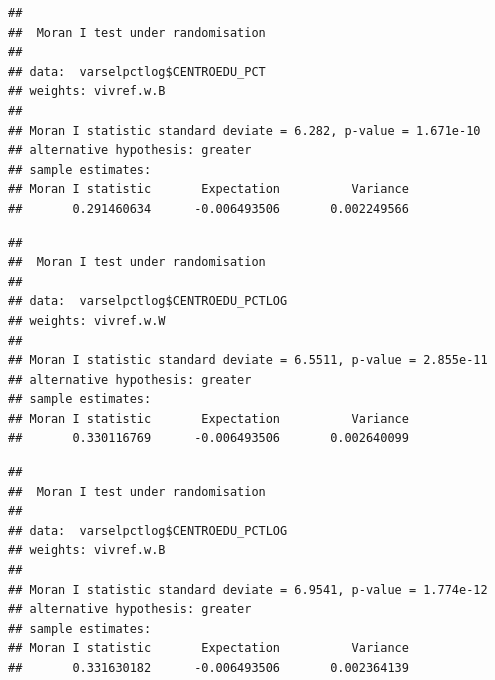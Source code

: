 \documentclass[11pt,]{article}
\newenvironment{Shaded}{\begin{snugshade}}{\end{snugshade}}
\newcommand{\KeywordTok}[1]{\textcolor[rgb]{0.13,0.29,0.53}{\textbf{#1}}}
\newcommand{\DataTypeTok}[1]{\textcolor[rgb]{0.13,0.29,0.53}{#1}}
\newcommand{\StringTok}[1]{\textcolor[rgb]{0.31,0.60,0.02}{#1}}
\newcommand{\OperatorTok}[1]{\textcolor[rgb]{0.81,0.36,0.00}{\textbf{#1}}}
\newcommand{\NormalTok}[1]{#1}
\begin{document}
\begin{verbatim}
## 
##  Moran I test under randomisation
## 
## data:  varselpctlog$CENTROEDU_PCT  
## weights: vivref.w.B    
## 
## Moran I statistic standard deviate = 6.282, p-value = 1.671e-10
## alternative hypothesis: greater
## sample estimates:
## Moran I statistic       Expectation          Variance 
##       0.291460634      -0.006493506       0.002249566
\end{verbatim}

\begin{Shaded}
\end{Shaded}

\begin{verbatim}
## 
##  Moran I test under randomisation
## 
## data:  varselpctlog$CENTROEDU_PCTLOG  
## weights: vivref.w.W    
## 
## Moran I statistic standard deviate = 6.5511, p-value = 2.855e-11
## alternative hypothesis: greater
## sample estimates:
## Moran I statistic       Expectation          Variance 
##       0.330116769      -0.006493506       0.002640099
\end{verbatim}

\begin{Shaded}
\end{Shaded}

\begin{verbatim}
## 
##  Moran I test under randomisation
## 
## data:  varselpctlog$CENTROEDU_PCTLOG  
## weights: vivref.w.B    
## 
## Moran I statistic standard deviate = 6.9541, p-value = 1.774e-12
## alternative hypothesis: greater
## sample estimates:
## Moran I statistic       Expectation          Variance 
##       0.331630182      -0.006493506       0.002364139
\end{verbatim}

\begin{Shaded}
\end{Shaded}
\end{document}
